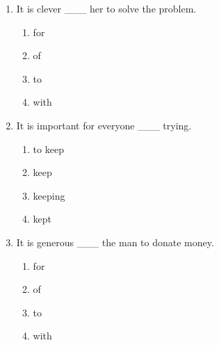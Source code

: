 \documentclass[11pt,a4paper]{ctexart}
\begin{document}
\begin{enumerate}[leftmargin=*,itemsep=4pt]
\begin{enumerate}[label=\Alph*.,leftmargin=2em,itemsep=1pt,topsep=2pt]
\item learned
\end{enumerate}
\item It is clever \_\_\_ her to solve the problem.
\begin{enumerate}[label=\Alph*.,leftmargin=2em,itemsep=1pt,topsep=2pt]
\item for
\item of
\item to
\item with
\end{enumerate}
\item It is important for everyone \_\_\_ trying.
\begin{enumerate}[label=\Alph*.,leftmargin=2em,itemsep=1pt,topsep=2pt]
\item to keep
\item keep
\item keeping
\item kept
\end{enumerate}
\item It is generous \_\_\_ the man to donate money.
\begin{enumerate}[label=\Alph*.,leftmargin=2em,itemsep=1pt,topsep=2pt]
\item for
\item of
\item to
\item with
\end{enumerate}
\end{enumerate}
\end{document}
